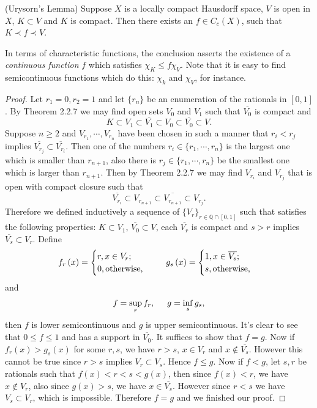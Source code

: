 \begin{theorem}(Urysorn's Lemma)
Suppose $X$ is a locally compact Hausdorff space, $V$ is open in $X$, $K\subset V$ and $K$ is compact. Then there exists an $f\in C_c(X)$, such that $K\prec f\prec V$.
\end{theorem}
In terms of characteristic functions, the conclusion asserts the existence of a \textit{continuous function} $f$ which satisfies $\chi_K\le f\chi_V$. Note that it is easy to find semicontinuous functions which do this: $\chi_k$ and $\chi_V$, for instance.
\begin{proof}
Let $r_1=0,r_2=1$ and let $\{r_n\}$ be an enumeration of the rationals in $[0,1]$. By Theorem 2.2.7 we may find open sets $V_0$ and $V_1$ such that $\overline{V_0}$ is compact and 
$$
K\subset V_1\subset \overline{V_1}\subset V_0\subset \overline{V_0}\subset V.
$$
Suppose $n\ge 2$ and $V_{r_1},\cdots,V_{r_n}$ have been chosen in such a manner that $r_i<r_j$ implies $\overline{V_{r_j}}\subset\overline{V_{r_i}}$. Then one of the numbers $r_i\in\{r_1,\cdots,r_n\}$ is the largest one which is smaller than $r_{n+1}$, also there is $r_j\in\{r_1,\cdots,r_n\}$  be the smallest one which is larger than $r_{n+1}$. Then by Theorem 2.2.7 we may find $V_{r_i}$ and $V_{r_j}$ that is open with compact closure such that 
$$
\overline{V_{r_i}}\subset V_{r_{n+1}}\subset \overline{V_{r_{n+1}}}\subset V_{r_j}.
$$
Therefore we defined inductively a sequence of $\{V_{r}\}_{r\in\mathbb{Q}\cap[0,1]}$ such that satisfies the following properties: $K\subset V_1$, $\overline{V_0}\subset V$, each $\overline{V_r}$ is compact and $s>r$ implies $\overline{V_s}\subset V_r$. Define 
$$
f_r\left( x \right) =\begin{cases}
	r,x\in V_r;\\
	0,\mathrm{otherwise},\\
\end{cases}\hspace{0.5cm}g_s\left( x \right) =\begin{cases}
	1,x\in \overline{V_s};\\
	s,\mathrm{otherwise},\\
\end{cases}
$$
and 
$$
f=\mathop {\mathrm{sup}} \limits_{r}f_r,\hspace{0.5cm}g=\mathop {\mathrm{inf}} \limits_{s}g_s,
$$
then $f$ is lower semicontinuous and $g$ is upper semicontinuous. It's clear to see that $0\le f\le 1$ and has a support in $\overline{V_0}$. It suffices to show that $f=g$. Now if $f_r(x)>g_s(x)$ for some $r,s$, we have $r>s$, $x\in V_r$ and $x\notin\overline{V_s}$. However this cannot be true since $r>s$ implies $V_r\subset V_s$. Hence $f\le g$. Now if $f<g$, let $s,r$ be rationals such that  $f(x)<r<s<g(x)$, then since $f(x)<r$, we have $x\notin V_r$, also since $g(x)>s$, we have $x\in\overline{V_s}$. However since $r<s$ we have $V_s\subset V_r$, which is impossible. Therefore $f=g$ and we finished our proof.
\end{proof}
